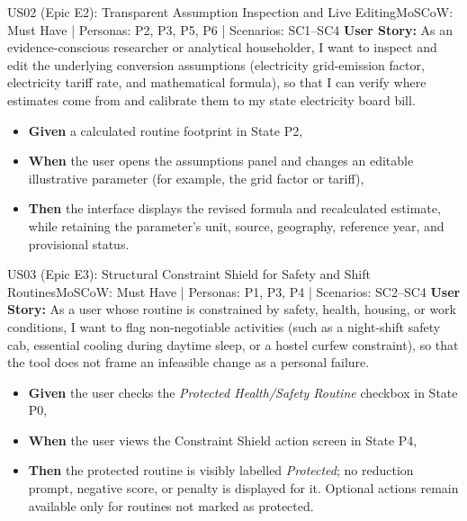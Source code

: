 \documentclass[12pt,a4paper]{article}
\begin{document}
\begin{storybox}{US02 (Epic E2): Transparent Assumption Inspection and Live Editing}{MoSCoW: Must Have | Personas: P2, P3, P5, P6 | Scenarios: SC1--SC4}
\textbf{User Story:} As an evidence-conscious researcher or analytical householder, I want to inspect and edit the underlying conversion assumptions (electricity grid-emission factor, electricity tariff rate, and mathematical formula), so that I can verify where estimates come from and calibrate them to my state electricity board bill.
\begin{itemize}
    \item \textbf{Given} a calculated routine footprint in State P2,
    \item \textbf{When} the user opens the assumptions panel and changes an editable illustrative parameter (for example, the grid factor or tariff),
    \item \textbf{Then} the interface displays the revised formula and recalculated estimate, while retaining the parameter's unit, source, geography, reference year, and provisional status.
\end{itemize}
\end{storybox}

\begin{storybox}{US03 (Epic E3): Structural Constraint Shield for Safety and Shift Routines}{MoSCoW: Must Have | Personas: P1, P3, P4 | Scenarios: SC2--SC4}
\textbf{User Story:} As a user whose routine is constrained by safety, health, housing, or work conditions, I want to flag non-negotiable activities (such as a night-shift safety cab, essential cooling during daytime sleep, or a hostel curfew constraint), so that the tool does not frame an infeasible change as a personal failure.
\begin{itemize}
    \item \textbf{Given} the user checks the \textit{Protected Health/Safety Routine} checkbox in State P0,
    \item \textbf{When} the user views the Constraint Shield action screen in State P4,
    \item \textbf{Then} the protected routine is visibly labelled \textit{Protected}; no reduction prompt, negative score, or penalty is displayed for it. Optional actions remain available only for routines not marked as protected.
\end{itemize}
\end{storybox}
\end{document}
